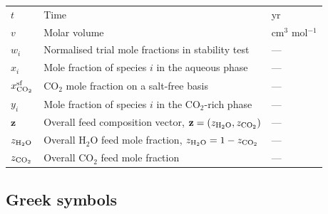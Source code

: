 \documentclass[preprint,12pt,number]{elsarticle}
\begin{document}
\begin{longtable}{@{}p{}p{}p{}@{}}
  $t$ & Time & yr \\
  $v$ & Molar volume & cm$^3$ mol$^{-1}$ \\
  $w_i$ & Normalised trial mole fractions in stability test & --- \\
  $x_i$ & Mole fraction of species $i$ in the aqueous phase & --- \\
  $x_{\rm CO_2}^{\rm sf}$ & CO$_2$ mole fraction on a salt-free basis & --- \\
  $y_i$ & Mole fraction of species $i$ in the CO$_2$-rich phase & --- \\
  $\mathbf{z}$ & Overall feed composition vector, $\mathbf{z} = (z_{\rm H_2O}, z_{\rm CO_2})$ & --- \\
  $z_{\rm H_2O}$ & Overall H$_2$O feed mole fraction, $z_{\rm H_2O} = 1 - z_{\rm CO_2}$ & --- \\
  $z_{\rm CO_2}$ & Overall CO$_2$ feed mole fraction & --- \\
\end{longtable}

\subsection*{Greek symbols}
\end{document}
